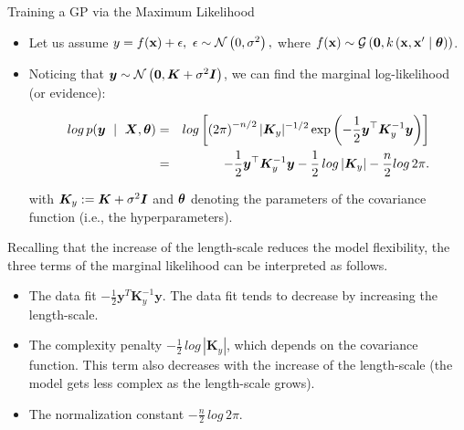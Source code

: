 \begin{frame}[c,allowframebreaks]{Training a GP via the Maximum Likelihood}

\begin{itemize}
\item Let us assume $y = f(\mathbf{x}) + \epsilon, ~ \epsilon \sim \mathcal{N}\left(0, \sigma^2\right),$ where $f(\mathbf{x}) \sim \mathcal{G}\left(\bm{0}, k\left(\mathbf{x}, \mathbf{x}^\prime \mid \bm{\theta} \right)\right)$.

\lz
\lz

\item Noticing that $\bm{y} \sim \mathcal{N}\left(\bm{0}, \bm{K} + \sigma^2 \boldsymbol{I}\right)$, we can find the marginal log-likelihood (or evidence):

\vspace{-5mm}

\begin{eqnarray*}
log\, p(\bm{y} ~\mid~ \bm{X}, \bm{\theta}) &=& log \left[\left(2 \pi\right)^{-n / 2} |\bm{K}_y|^{-1 / 2} \exp\left(- \frac{1}{2} \bm{y}^\top \bm{K}_y^{-1} \bm{y}\right) \right]\\
&=& -\frac{1}{2}\bm{y}^\top\bm{K}_y^{-1} \bm{y} - \frac{1}{2}\, log \left| \bm{K}_y \right| - \frac{n}{2} log\,2\pi. 
\end{eqnarray*}

with $\bm{K}_y:=\bm{K} + \sigma^2 \boldsymbol{I}$ and $\bm{\theta}$ denoting the parameters of the covariance function (i.e., the hyperparameters).
\end{itemize}

\framebreak

Recalling that the increase of the length-scale reduces the model flexibility, the three terms of the marginal likelihood can be interpreted as follows.
\vspace{1cm}

\begin{itemize}
\item The data fit $-\frac{1}{2}\bm{y}^T\bm{K}_y^{-1} \bm{y}$. The data fit tends to decrease by increasing the length-scale.
\vspace{.5cm}

\item The complexity penalty $- \frac{1}{2}\,log\,\left| \bm{K}_y \right|$, which depends on the covariance function. This term also decreases with the increase of the length-scale (the model gets less complex as the length-scale grows).
\vspace{.5cm}

\item The normalization constant $- \frac{n}{2}\,log\,2\pi$.
\end{itemize}


\end{frame}

